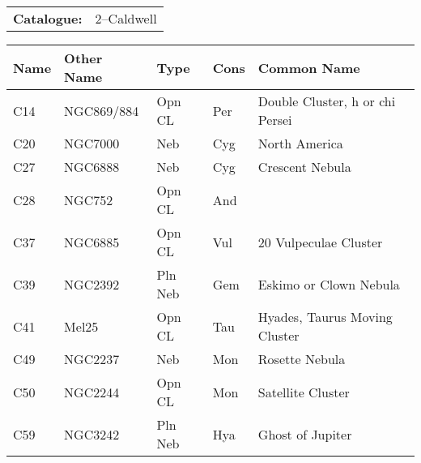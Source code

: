 \begin{tabular}{ p{0.9in} p{1.3in}}
{\bf Catalogue:} & 2--Caldwell \\ 
\end{tabular}
\begin{longtable}{ p{0.7in}  p{1.0in}  p{0.6in}  p{0.9in}  p{5.1in} }
\hline 
{\bf Name} & {\bf Other Name} & {\bf Type} & {\bf Cons} & {\bf Common Name} \\ 
\hline 
C14 & NGC869/884 & Opn CL & Per & Double Cluster, h or chi Persei \\ 
C20 & NGC7000 & Neb & Cyg & North America \\ 
C27 & NGC6888 & Neb & Cyg & Crescent Nebula \\ 
C28 & NGC752 & Opn CL & And &  \\ 
C37 & NGC6885 & Opn CL & Vul & 20 Vulpeculae Cluster \\ 
C39 & NGC2392 & Pln Neb & Gem & Eskimo or Clown Nebula \\ 
C41 & Mel25 & Opn CL & Tau & Hyades, Taurus Moving Cluster \\ 
C49 & NGC2237 & Neb & Mon & Rosette Nebula \\ 
C50 & NGC2244 & Opn CL & Mon & Satellite Cluster \\ 
C59 & NGC3242 & Pln Neb & Hya & Ghost of Jupiter \\ 
\hline 
\end{longtable} 
